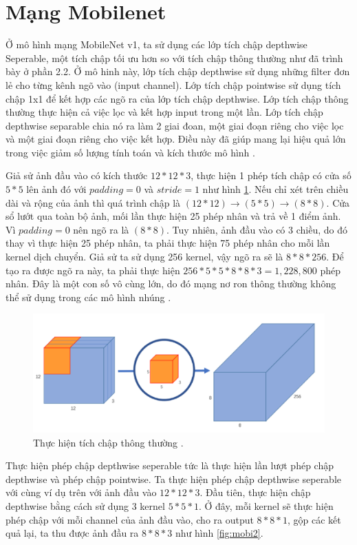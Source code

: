 \section{Mạng Mobilenet}
Ở mô hình mạng MobileNet v1, ta sử dụng các lớp tích chập depthwise Seperable, một tích chập tối ưu hơn so với tích chập thông thường như đã trình bày ở phần 2.2. Ở mô hinh này, lớp tích chập depthwise sử dụng những filter đơn lẻ cho từng kênh ngõ vào (input channel). Lớp tích chập pointwise sử dụng tích chập 1x1 để kết hợp các ngõ ra của lớp tích chập depthwise. Lớp tích chập thông thường thực hiện cả việc lọc và kết hợp input trong một lần. Lớp tích chập depthwise separable chia nó ra làm 2 giai đoan, một giai đoạn riêng cho việc lọc và một giai đoạn riêng cho việc kết hợp. Điều này đã giúp mang lại hiệu quả lớn trong việc giảm số lượng tính toán và kích thước mô hình \cite{mobile:viblo}.\par

Giả sử ảnh đầu vào có kích thước $12*12*3$, thực hiện 1 phép tích chập có cửa số $5*5$ lên ảnh đó với $padding = 0$ và $stride = 1$ như hình \ref{fig:mobi1}. Nếu chỉ xét trên chiều dài và rộng của ảnh thì quá trình chập là $(12*12)\rightarrow(5*5) \rightarrow (8*8)$. Cửa sổ lướt qua toàn bộ ảnh, mối lần thực hiện 25 phép nhân và trả về 1 điểm ảnh. Vì $padding =0$ nên ngõ ra là $(8*8)$. Tuy nhiên, ảnh đầu vào có 3 chiều, do đó thay vì thực hiện 25 phép nhân, ta phải thực hiện 75 phép nhân cho mỗi lần kernel dịch chuyển. Giả sử ta sử dụng 256 kernel, vậy ngõ ra sẽ là $8*8*256$. Để tạo ra được ngõ ra này, ta phải thực hiện $256*5*5*8*8*3= 1,228,800$ phép nhân. Đây là một con số vô cùng lớn, do đó mạng nơ ron thông thường không thể sử dụng trong các mô hình nhúng \cite{mobile:viblo}.\par
\begin{figure}[ht!]
\centerline{\includegraphics[scale=0.9]{images/mobi1.png}}
\caption{Thực hiện tích chập thông thường \cite{mobile:viblo}.}
\label{fig:mobi1}
\end{figure}
Thực hiện phép chập depthwise seperable tức là thực hiện lần lượt phép chập depthwise và phép chập pointwise. Ta thực hiện phép chập depthwise seperable với cùng ví dụ trên với ảnh đầu vào $12*12*3$. Đầu tiên, thực hiện chập depthwise bằng cách sử dụng 3 kernel $5*5*1$. Ở đây, mỗi kernel sẽ thực hiện phép chập với mỗi channel của ảnh đầu vào, cho ra output $8*8*1$, gộp các kết quả lại, ta thu được ảnh đầu ra $8*8*3$ như hình \ref{fig:mobi2}.\par

